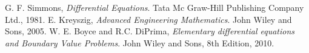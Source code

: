 \begin{thebibliography}{99}
\let\clearpage\relax
{} G. F. Simmons, \emph{Differential Equations}. Tata Mc Graw-Hill Publishing Company Ltd., 1981.
 E. Kreyszig, \emph{Advanced Engineering Mathematics}. John Wiley and Sons, 2005.
 W. E. Boyce and R.C. DiPrima, \emph{Elementary differential equations and Boundary Value Problems}. John Wiley and Sons, 8th Edition, 2010.

\end{thebibliography}














